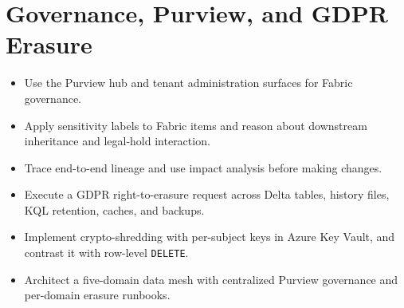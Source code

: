 \chapter{Governance, Purview, and GDPR Erasure}
%

\begin{objectives}
\begin{itemize}
    \item Use the Purview hub and tenant administration surfaces for Fabric governance.
    \item Apply sensitivity labels to Fabric items and reason about downstream inheritance and legal-hold interaction.
    \item Trace end-to-end lineage and use impact analysis before making changes.
    \item Execute a GDPR right-to-erasure request across Delta tables, history files, KQL retention, caches, and backups.
    \item Implement crypto-shredding with per-subject keys in Azure Key Vault, and contrast it with row-level \texttt{DELETE}.
    \item Architect a five-domain data mesh with centralized Purview governance and per-domain erasure runbooks.
\end{itemize}
\end{objectives}

